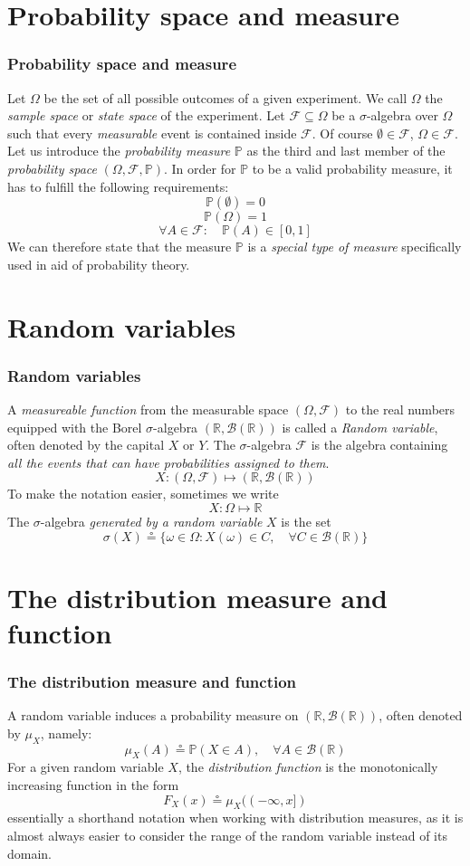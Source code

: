 \documentclass[xcolor=dvipsnames]{beamer}
\begin{document}
\section{Probability space and measure}
\begin{frame}
\frametitle{Probability space and measure}
Let $\Omega$ be the set of all possible outcomes of a given experiment. We call $\Omega$ the \emph{sample space} or \emph{state space} of the experiment. Let $\mathcal{F} \subseteq \Omega$ be a $\sigma$-algebra over $\Omega$ such that every \emph{measurable} event is contained inside $\mathcal{F}$. Of course $\emptyset \in \mathcal{F}$, $\Omega \in \mathcal{F}$. Let us introduce the \emph{probability measure} $\mathbb{P}$ as the third and last member of the \emph{probability space} $(\Omega, \mathcal{F}, \mathbb{P})$. In order for $\mathbb{P}$ to be a valid probability measure, it has to fulfill the following requirements:
\[
	\mathbb{P}(\emptyset) = 0
\] 
\[
	\mathbb{P}(\Omega) = 1
\]
\[
	\forall A \in \mathcal{F}: \quad \mathbb{P}(A) \in [0, 1]
\]
We can therefore state that the measure $\mathbb{P}$ is a \emph{special type of measure} specifically used in aid of probability theory.
\end{frame}
\section{Random variables}
\begin{frame}
\frametitle{Random variables}
A \emph{measureable function} from the measurable space $(\Omega, \mathcal{F})$ to the real numbers equipped with the Borel $\sigma$-algebra $(\mathbb{R}, \mathcal{B}(\mathbb{R}))$ is called a \emph{Random variable}, often denoted by the capital $X$ or $Y$. The $\sigma$-algebra $\mathcal{F}$ is the algebra containing \emph{all the events that can have probabilities assigned to them}.
\[
	X : (\Omega, \mathcal{F}) \mapsto (\mathbb{R}, \mathcal{B}(\mathbb{R}))
\]
To make the notation easier, sometimes we write
\[
	X : \Omega \mapsto \mathbb{R}
\]
The $\sigma$-algebra \emph{generated by a random variable} $X$ is the set
\[
	\sigma(X) \circeq \{\omega \in \Omega : X(\omega) \in C, \quad \forall C \in \mathcal{B}(\mathbb{R})\}
\]
\end{frame}
\section{The distribution measure and function}
\begin{frame}
\frametitle{The distribution measure and function}
A random variable induces a probability measure on $(\mathbb{R}, \mathcal{B}(\mathbb{R}))$, often denoted by $\mu_X$, namely:
\[
	\mu_X(A) \circeq \mathbb{P}(X \in A), \quad \forall A \in \mathcal{B}(\mathbb{R})
\]
For a given random variable $X$, the \emph{distribution function} is the monotonically increasing function in the form
\[
	F_X(x) \circeq \mu_X((-\infty, x])
\]
essentially a shorthand notation when working with distribution measures, as it is almost always easier to consider the range of the random variable instead of its domain.
\end{frame}
\end{document}
